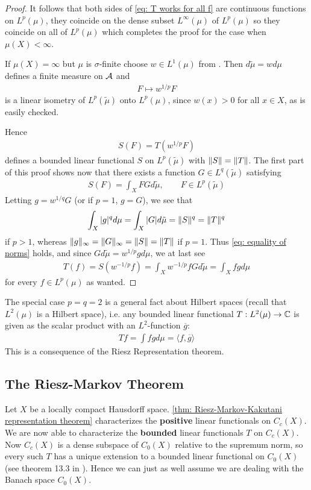 \begin{proof}
It follows that both sides of \eqref{eq: T works for all f} are continuous functions on $L^{p}(\mu)$, they coincide on the dense subset $L^{\infty}(\mu)$ of $L^{p}(\mu)$ so they coincide on all of $L^{p}(\mu)$ which completes the proof for the case when $\mu(X)<\infty$.

If $\mu(X)=\infty$ but $\mu$ is $\sigma$-finite choose $w\in L^{1}(\mu)$ from . Then $d\tilde{\mu}=wd\mu$ defines a finite measure on $\mathcal{A}$ and
\begin{align*}
	F\mapsto w^{1/p}F
\end{align*}
is a linear isometry of $L^{p}(\tilde{\mu})$ onto $L^{p}(\mu)$, since $w(x)>0$ for all $x\in X$, as is easily checked.

Hence
\begin{align*}
	S(F)=T(w^{1/p}F)
\end{align*}
defines a bounded linear functional $S$ on $L^{p}(\tilde{\mu})$ with $\Vert{S}\Vert=\Vert{T}\Vert$.
The first part of this proof shows now that there exists a function $G\in L^{q}(\tilde{\mu})$ satisfying
\begin{align*}
	S(F)=\int_{X}FGd\tilde{\mu}, \qquad F\in L^{p}(\tilde{\mu})
\end{align*}
Letting $g=w^{1/q}G$ (or if $p=1$, $g=G$), we see that
\begin{align*}
	\int_{X}|g|^{q}d\mu=\int_{X}|G|d\tilde{\mu}=\Vert{S}\Vert^{q}=\Vert{T}\Vert^{q}
\end{align*} 
if $p>1$, whereas $\Vert{g}\Vert_{\infty}=\Vert{G}\Vert_{\infty}=\Vert{S}\Vert=\Vert{T}\Vert$ if $p=1$. Thus \eqref{eq: equality of norms} holds, and since $Gd\tilde{\mu}=w^{1/p}gd\mu$, we at last see
\begin{align*}
	T(f)=S(w^{-1/p}f)=\int_{X}w^{-1/p}fGd\tilde{\mu}=\int_{X}fgd\mu
\end{align*}
for every $f\in L^{p}(\mu)$ as wanted.
\end{proof}

The special case $p=q=2$ is a general fact about Hilbert spaces (recall that $L^{2}(\mu)$ is a Hilbert space), i.e. any bounded linear functional $T:L^{2}(\mu)\to \mathbb{C}$ is given as the scalar product with an $L^{2}$-function $\overline{g}$:
\begin{align*}
	Tf=\int fg d\mu=\langle f,\overline{g} \rangle
\end{align*}
This is a consequence of the Riesz Representation theorem.

\subsection{The Riesz-Markov Theorem}
Let $X$ be a locally compact Hausdorff space. \cref{thm: Riesz-Markov-Kakutani representation theorem} characterizes the \textbf{positive} linear functionals on $C_{c}(X)$. We are now able to characterize the \textbf{bounded} linear functionals $T$ on $C_{c}(X)$. Now $C_{c}(X)$ is a dense subspace of $C_{0}(X)$ relative to the supremum norm, so every such $T$ has a unique extension to a bounded linear functional on $C_{0}(X)$ (see theorem 13.3 in \cite{Musat17}). Hence we can just as well assume we are dealing with the Banach space $C_{0}(X)$.

